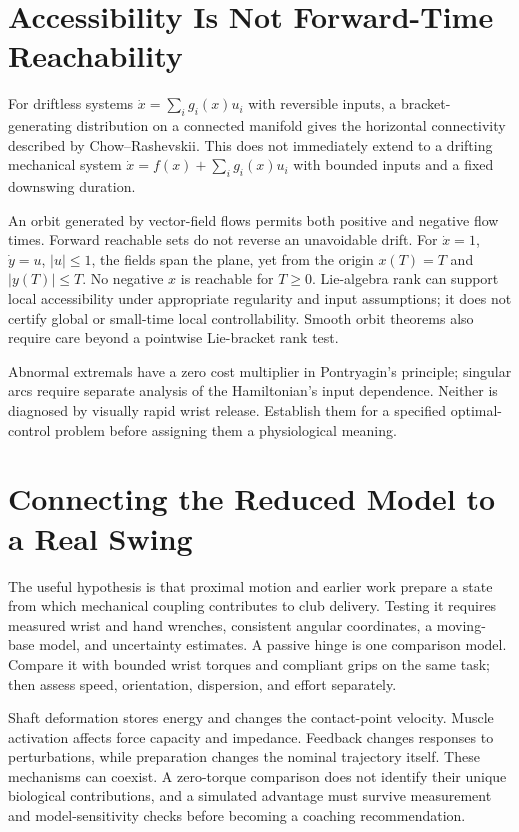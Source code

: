 \section{Accessibility Is Not Forward-Time Reachability}

For driftless systems $\dot x=\sum_i g_i(x)u_i$ with reversible inputs, a
bracket-generating distribution on a connected manifold gives the horizontal
connectivity described by Chow--Rashevskii. This does not immediately extend
to a drifting mechanical system $\dot x=f(x)+\sum_i g_i(x)u_i$ with bounded
inputs and a fixed downswing duration.

An orbit generated by vector-field flows permits both positive and negative
flow times. Forward reachable sets do not reverse an unavoidable drift.
For $\dot x=1$, $\dot y=u$, $|u|\leq1$, the fields span the plane, yet from
the origin $x(T)=T$ and $|y(T)|\leq T$. No negative $x$ is reachable for
$T\geq0$. Lie-algebra rank can support local accessibility under appropriate
regularity and input assumptions; it does not certify global or small-time
local controllability. Smooth orbit theorems also require care beyond a
pointwise Lie-bracket rank test.

Abnormal extremals have a zero cost multiplier in Pontryagin's principle;
singular arcs require separate analysis of the Hamiltonian's input dependence.
Neither is diagnosed by visually rapid wrist release. Establish them for a
specified optimal-control problem before assigning them a physiological meaning.

\section{Connecting the Reduced Model to a Real Swing}

The useful hypothesis is that proximal motion and earlier work prepare a state
from which mechanical coupling contributes to club delivery. Testing it requires
measured wrist and hand wrenches, consistent angular coordinates, a moving-base
model, and uncertainty estimates. A passive hinge is one comparison model.
Compare it with bounded wrist torques and compliant grips on the same task;
then assess speed, orientation, dispersion, and effort separately.

Shaft deformation stores energy and changes the contact-point velocity. Muscle
activation affects force capacity and impedance. Feedback changes responses to
perturbations, while preparation changes the nominal trajectory itself. These
mechanisms can coexist. A zero-torque comparison does not identify their unique
biological contributions, and a simulated advantage must survive measurement
and model-sensitivity checks before becoming a coaching recommendation.

